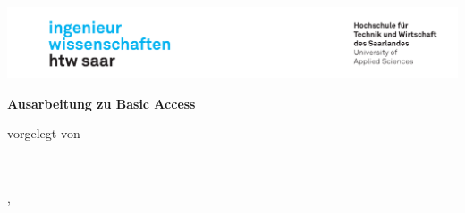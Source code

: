 \begin{titlepage}\linespread{1.5}\selectfont
\includegraphics[width=\linewidth]{Graphics/htwsaar_Logo_inwi_head_VF_4C_crop}
  \begin{center}
    \large  
    \hfill
    \vfill
    \begingroup
      \Large\bfseries\huge Ausarbeitung zu Basic Access
    \endgroup
		
% 		
%     
  \vfill
% 	
% 	
	
  vorgelegt von \\
  \vspace{\baselineskip}
  \NameL\\
  \NameY\\
	
  \vfill
	
% 	
  \vfill
	
  \myLocation, \myTime                   

    \end{center}       
\end{titlepage}   